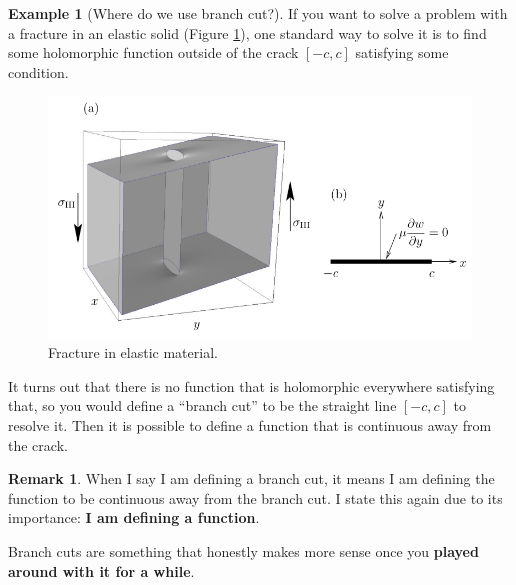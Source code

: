 \documentclass[a4paper, 12pt]{article}
\theoremstyle{definition}
\newtheorem{example}{Example}
\newtheorem{remark}{Remark}
\numberwithin{theorem}{section}
\numberwithin{definition}{section}
\numberwithin{exercise}{section}
\numberwithin{remark}{section}
\numberwithin{figure}{section}
\numberwithin{example}{section}
\begin{document}
\begin{example}[Where do we use branch cut?]
If you want to solve a problem with a fracture in an elastic solid (Figure \ref{fig: Crack Tip}),
one standard way to solve it is to find some holomorphic function outside of the crack $\left[ -c,c \right]$
satisfying some condition.
\begin{figure}[tbp]
    \centering
    \includegraphics[scale=.5]{crackTip}
    \caption{Fracture in elastic material.}
    \label{fig: Crack Tip}
\end{figure}
It turns out that there is no function that is holomorphic everywhere satisfying that,
so you would define a ``branch cut'' to be the straight line $\left[ -c,c \right]$ to resolve it.
Then it is possible to define a function that is continuous away from the crack.
\end{example}

\begin{remark}
    When I say I am defining a branch cut,
    it means I am defining the function to be continuous away from the branch cut.
    I state this again due to its importance: \textbf{I am defining a function}.
\end{remark}

Branch cuts are something that honestly makes more sense once you \textbf{played around with it for a while}.
\end{document}
